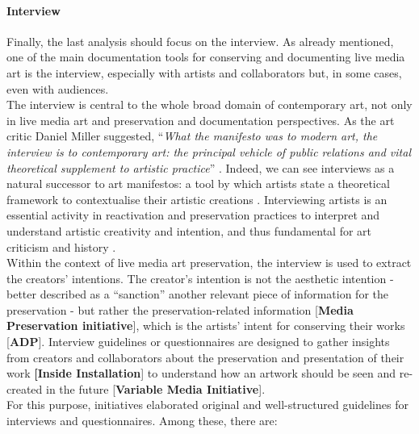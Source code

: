 \paragraph*{Interview}
Finally, the last analysis should focus on the interview. As already mentioned, one of the main documentation tools for conserving and documenting live media art is the interview, especially with artists and collaborators but, in some cases, even with audiences.\\
The interview is central to the whole broad domain of contemporary art, not only in live media art and preservation and documentation perspectives. As the art critic Daniel Miller suggested, ``\textit{What the manifesto was to modern art, the interview is to contemporary art: the principal vehicle of public relations and vital theoretical supplement to artistic practice}'' \cite{miller2009now}. Indeed, we can see interviews as a natural successor to art manifestos: a tool by which artists state a theoretical framework to contextualise their artistic creations \cite{lichtin2016you}. Interviewing artists is an essential activity in reactivation and preservation practices to interpret and understand artistic creativity and intention, and thus fundamental for art criticism and history \cite{wielocha2021collecting}.\\
Within the context of live media art preservation, the interview is used to extract the creators' intentions. The creator’s intention is not the aesthetic intention \cite{aiken1955aesthetic, gendin1964artist} - better described as a ``sanction'' \cite{irvin2005artist} another relevant piece of information for the preservation - but rather the preservation-related information [\textbf{Media Preservation initiative}], which is the artists’ intent for conserving their works [\textbf{ADP}]. Interview guidelines or questionnaires are designed to gather insights from creators and collaborators about the preservation and presentation of their work \textbf{[Inside Installation}] to understand how an artwork should be seen and re-created in the future [\textbf{Variable Media Initiative}].\\
For this purpose, initiatives elaborated original and well-structured guidelines for interviews and questionnaires. Among these, there are: 
